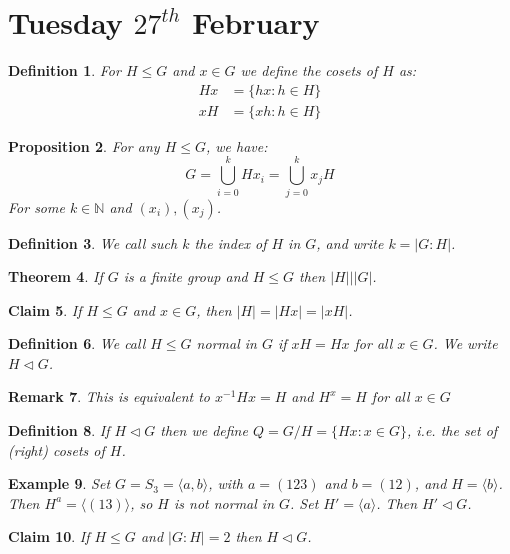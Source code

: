 \documentclass[a4paper,10pt]{article}
\newcommand{\NN}{\mathbb{N}}
\newtheorem{thm}{Theorem}
\newtheorem{Def}[thm]{Definition}
\newtheorem{cl}[thm]{Claim}
\newtheorem{prop}[thm]{Proposition}
\newtheorem{eg}[thm]{Example}
\newtheorem{rem}[thm]{Remark}
\begin{document}
\newpage
\section{Tuesday $27^{th}$ February}

\begin{Def}
For $H \leq G$ and $x \in G$ we define the cosets of $H$ as:
\begin{align*}
Hx &= \{hx : h \in H \} \\
xH &= \{xh : h \in H \}
\end{align*}

\end{Def}
\begin{prop}
For any $H \leq G$, we have:
\[ G = \bigcup_{i=0}^k Hx_i = \bigcup_{j=0}^k x_jH \]
For some $k \in \NN$ and $(x_i), (x_j)$.
\end{prop}
\begin{Def}
We call such $k$ the index of $H$ in $G$, and write $k = |G : H|$. 
\end{Def}
\begin{thm}
If $G$ is a finite group and $H \leq G$ then $|H| \big| |G|$.
\end{thm}
\begin{cl}
If $H \leq G$ and $x \in G$, then $|H| = |Hx| = |xH|$.
\end{cl}
\begin{Def}
We call $H \leq G$ normal in $G$ if $xH = Hx$ for all $x \in G$. We write $H \triangleleft G$. 
\end{Def}
\begin{rem}
This is equivalent to $x^{-1}Hx = H$ and $H^x = H$ for all $x \in G$
\end{rem}
\begin{Def}
If $H \triangleleft G$ then we define $Q = G / H = \{Hx : x \in G\}$, i.e. the set of (right) cosets of $H$.
\end{Def}
\begin{eg}
Set $G = S_3 = \langle a,b\rangle$, with $a = (123)$ and $b = (12)$, and $H = \langle b \rangle$. Then $H^a = \langle (13) \rangle$, so $H$ is not normal in $G$. Set $H' = \langle a \rangle$. Then $H' \triangleleft G$.
\end{eg}
\begin{cl}
If $H \leq G$ and $|G : H| = 2$ then $H \triangleleft G$.
\end{cl}
\end{document}
